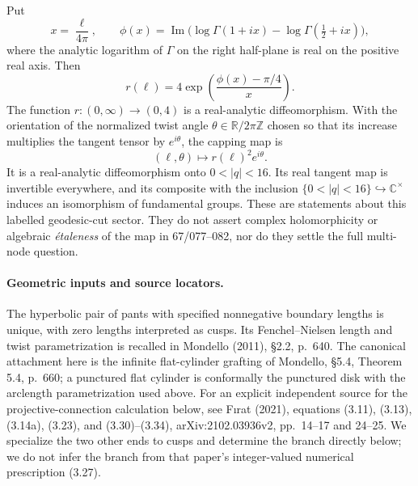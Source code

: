 \documentclass[11pt,a4paper]{article}
\theoremstyle{definition}\newtheorem{definition}[theorem]{Definition}
\theoremstyle{remark}\newtheorem{remark}[theorem]{Remark}
\begin{document}
Put
\[
 x=\frac{\ell}{4\pi},\qquad
 \phi(x)=\operatorname{Im}\bigl(\log\Gamma(1+ix)
                       -\log\Gamma(\tfrac12+ix)\bigr),
\]
where the analytic logarithm of $\Gamma$ on the right half-plane is
real on the positive real axis. Then
\[
 \boxed{\quad r(\ell)=4\exp\!\left(\frac{\phi(x)-\pi/4}{x}\right).\quad}
                                                               \tag{AQ.67.1}
\]
The function $r:(0,\infty)\longrightarrow(0,4)$ is a real-analytic
diffeomorphism. With the orientation of the normalized twist angle
$\theta\in\mathbb R/2\pi\mathbb Z$ chosen so that its increase multiplies
the tangent tensor by $e^{i\theta}$, the capping map is
\[
 (\ell,\theta)\longmapsto r(\ell)^2e^{i\theta}.
                                                               \tag{AQ.67.2}
\]
It is a real-analytic diffeomorphism onto $0<|q|<16$.
Its real tangent map is invertible everywhere, and its composite with
the inclusion $\{0<|q|<16\}\hookrightarrow\mathbb C^\times$ induces an
isomorphism of fundamental groups. These are statements about this
labelled geodesic-cut sector. They do not assert complex holomorphicity
or algebraic \emph{\'etaleness} of the map in 67/077--082, nor do they
settle the full multi-node question.

\paragraph{Geometric inputs and source locators.}
The hyperbolic pair of pants with specified nonnegative boundary
lengths is unique, with zero lengths interpreted as cusps. Its
Fenchel--Nielsen length and twist parametrization is recalled in
Mondello (2011), \S2.2, p.~640. The canonical attachment here is the
infinite flat-cylinder grafting of Mondello, \S5.4,
Theorem 5.4, p.~660; a punctured flat cylinder is conformally the
punctured disk with the arclength parametrization used above.
For an explicit independent source for the projective-connection
calculation below, see F\i rat (2021), equations (3.11), (3.13),
(3.14a), (3.23), and (3.30)--(3.34), arXiv:2102.03936v2,
pp.~14--17 and 24--25. We specialize the two other ends to cusps
and determine the branch directly below; we do not infer the branch
from that paper's integer-valued numerical prescription (3.27).
\end{document}
